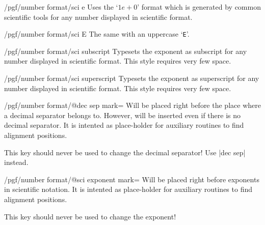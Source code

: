 \begin{key}{/pgf/number format/sci e}
Uses the `$1e{+}0$' format which is generated by common scientific tools for any number displayed in scientific format.

\begin{codeexample}[]
\end{codeexample}
\end{key}

\begin{key}{/pgf/number format/sci E}
The same with an uppercase `\texttt{E}'.

\begin{codeexample}[]
\end{codeexample}
\end{key}

\begin{key}{/pgf/number format/sci subscript}
Typesets the exponent as subscript for any number displayed in scientific format. This style requires very few space.

\begin{codeexample}[]
\end{codeexample}
\end{key}

\begin{key}{/pgf/number format/sci superscript}
Typesets the exponent as superscript for any number displayed in scientific format. This style requires very few space.

\begin{codeexample}[]
\end{codeexample}
\end{key}

\begin{key}{/pgf/number format/@dec sep mark=}
	Will be placed right before the place where a decimal separator belongs to. However,  will be inserted even if there is no decimal separator. It is intented as place-holder for auxiliary routines to find alignment positions.

	This key should never be used to change the decimal separator! Use |dec sep| instead. 
\end{key}

\begin{key}{/pgf/number format/@sci exponent mark=}
	Will be placed right before exponents in scientific notation. It is intented as place-holder for auxiliary routines to find alignment positions.

	This key should never be used to change the exponent!
\end{key}

